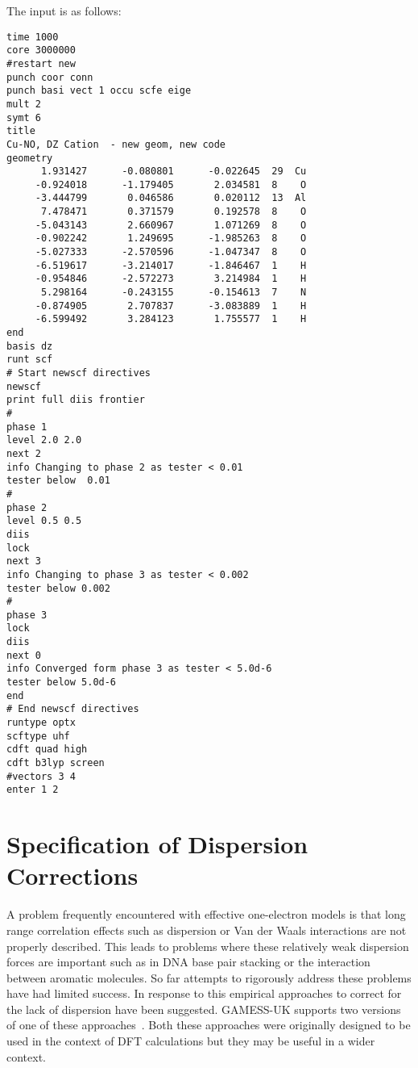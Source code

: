 \documentclass[11pt,fleqn]{article}
\begin{document}
The input is as follows:

{
\footnotesize
\begin{verbatim}
time 1000
core 3000000
#restart new
punch coor conn
punch basi vect 1 occu scfe eige
mult 2
symt 6
title
Cu-NO, DZ Cation  - new geom, new code
geometry
      1.931427      -0.080801      -0.022645  29  Cu
     -0.924018      -1.179405       2.034581  8    O
     -3.444799       0.046586       0.020112  13  Al
      7.478471       0.371579       0.192578  8    O
     -5.043143       2.660967       1.071269  8    O
     -0.902242       1.249695      -1.985263  8    O
     -5.027333      -2.570596      -1.047347  8    O
     -6.519617      -3.214017      -1.846467  1    H
     -0.954846      -2.572273       3.214984  1    H
      5.298164      -0.243155      -0.154613  7    N
     -0.874905       2.707837      -3.083889  1    H
     -6.599492       3.284123       1.755577  1    H
end
basis dz
runt scf
# Start newscf directives
newscf
print full diis frontier
#
phase 1
level 2.0 2.0
next 2
info Changing to phase 2 as tester < 0.01
tester below  0.01
#
phase 2
level 0.5 0.5
diis
lock
next 3
info Changing to phase 3 as tester < 0.002
tester below 0.002
#
phase 3
lock
diis
next 0
info Converged form phase 3 as tester < 5.0d-6
tester below 5.0d-6
end
# End newscf directives
runtype optx
scftype uhf
cdft quad high
cdft b3lyp screen
#vectors 3 4
enter 1 2
\end{verbatim}
}


\section{Specification of Dispersion Corrections}
\label{vanderwaals-corr}

A problem frequently encountered with effective one-electron models is that
long range
correlation effects such as dispersion or Van der Waals interactions are not
properly described. This leads to problems where these relatively weak 
dispersion forces are important such as in DNA base pair stacking or the 
interaction between aromatic molecules. So far attempts to rigorously address
these problems have had limited success. In response to this empirical 
approaches to correct for the lack of dispersion have been suggested. GAMESS-UK
supports two versions of one of these
approaches~\cite{grimme04,grimme06,antony06}.
Both these approaches were originally designed to be used in the context of 
DFT calculations but they may be useful in a wider context.
\end{document}
